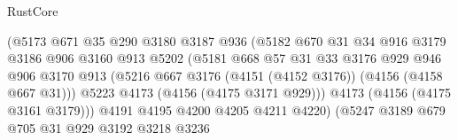 \begin{lexlean}{RustCore}
\begin{coremodule}
                                      (@5173
                                        @671
                                        @35
                                        @290
                                        @3180
                                        @3187
                                        @936
                                        (@5182
                                          @670
                                          @31
                                          @34
                                          @916
                                          @3179
                                          @3186
                                          @906
                                          @3160
                                          @913
                                          @5202
                                          (@5181
                                            @668
                                            @57
                                            @31
                                            @33
                                            @3176
                                            @929
                                            @946
                                            @906
                                            @3170
                                            @913
                                            (@5216
                                              @667
                                              @3176
                                              (@4151 (@4152 @3176))
                                              (@4156 (@4158 @667 @31)))
                                            @5223
                                            @4173
                                            (@4156 (@4175 @3171 @929)))
                                          @4173
                                          (@4156 (@4175 @3161 @3179)))
                                        @4191
                                        @4195
                                        @4200
                                        @4205
                                        @4211
                                        @4220)
                                      (@5247
                                        @3189
                                        @679
                                        @705
                                        @31
                                        @929
                                        @3192
                                        @3218
                                        @3236

\end{coremodule}
\end{lexlean}
